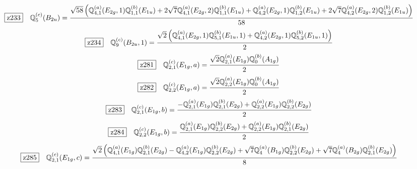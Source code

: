 \documentclass[fleqn,10pt,landscape]{jsarticle}
\begin{document}
\begin{dmath*}
\hspace*{3mm}\fbox{z233}\quad \mathbb{Q}_{5}^{(c)}(B_{2u})=\frac{\sqrt{58} \left(\mathbb{Q}_{4,1}^{(a)}(E_{2g},1) \mathbb{Q}_{1,1}^{(b)}(E_{1u}) + 2 \sqrt{7} \mathbb{Q}_{4,1}^{(a)}(E_{2g},2) \mathbb{Q}_{1,1}^{(b)}(E_{1u}) + \mathbb{Q}_{4,2}^{(a)}(E_{2g},1) \mathbb{Q}_{1,2}^{(b)}(E_{1u}) + 2 \sqrt{7} \mathbb{Q}_{4,2}^{(a)}(E_{2g},2) \mathbb{Q}_{1,2}^{(b)}(E_{1u})\right)}{58}
\end{dmath*}
\begin{dmath*}
\hspace*{3mm}\fbox{z234}\quad \mathbb{Q}_{9}^{(c)}(B_{2u},1)=\frac{\sqrt{2} \left(\mathbb{Q}_{4,1}^{(a)}(E_{2g},1) \mathbb{Q}_{5,1}^{(b)}(E_{1u},1) + \mathbb{Q}_{4,2}^{(a)}(E_{2g},1) \mathbb{Q}_{5,2}^{(b)}(E_{1u},1)\right)}{2}
\end{dmath*}
\begin{dmath*}
\hspace*{3mm}\fbox{z281}\quad \mathbb{Q}_{2,1}^{(c)}(E_{1g},a)=\frac{\sqrt{2} \mathbb{Q}_{2,1}^{(a)}(E_{1g}) \mathbb{Q}_{0}^{(b)}(A_{1g})}{2}
\end{dmath*}
\begin{dmath*}
\hspace*{3mm}\fbox{z282}\quad \mathbb{Q}_{2,2}^{(c)}(E_{1g},a)=\frac{\sqrt{2} \mathbb{Q}_{2,2}^{(a)}(E_{1g}) \mathbb{Q}_{0}^{(b)}(A_{1g})}{2}
\end{dmath*}
\begin{dmath*}
\hspace*{3mm}\fbox{z283}\quad \mathbb{Q}_{2,1}^{(c)}(E_{1g},b)=\frac{- \mathbb{Q}_{2,1}^{(a)}(E_{1g}) \mathbb{Q}_{2,1}^{(b)}(E_{2g}) + \mathbb{Q}_{2,2}^{(a)}(E_{1g}) \mathbb{Q}_{2,2}^{(b)}(E_{2g})}{2}
\end{dmath*}
\begin{dmath*}
\hspace*{3mm}\fbox{z284}\quad \mathbb{Q}_{2,2}^{(c)}(E_{1g},b)=\frac{\mathbb{Q}_{2,1}^{(a)}(E_{1g}) \mathbb{Q}_{2,2}^{(b)}(E_{2g}) + \mathbb{Q}_{2,2}^{(a)}(E_{1g}) \mathbb{Q}_{2,1}^{(b)}(E_{2g})}{2}
\end{dmath*}
\begin{dmath*}
\hspace*{3mm}\fbox{z285}\quad \mathbb{Q}_{2,1}^{(c)}(E_{1g},c)=\frac{\sqrt{2} \left(\mathbb{Q}_{4,1}^{(a)}(E_{1g}) \mathbb{Q}_{2,1}^{(b)}(E_{2g}) - \mathbb{Q}_{4,2}^{(a)}(E_{1g}) \mathbb{Q}_{2,2}^{(b)}(E_{2g}) + \sqrt{7} \mathbb{Q}_{4}^{(a)}(B_{1g}) \mathbb{Q}_{2,2}^{(b)}(E_{2g}) + \sqrt{7} \mathbb{Q}_{4}^{(a)}(B_{2g}) \mathbb{Q}_{2,1}^{(b)}(E_{2g})\right)}{8}
\end{dmath*}
\end{document}
